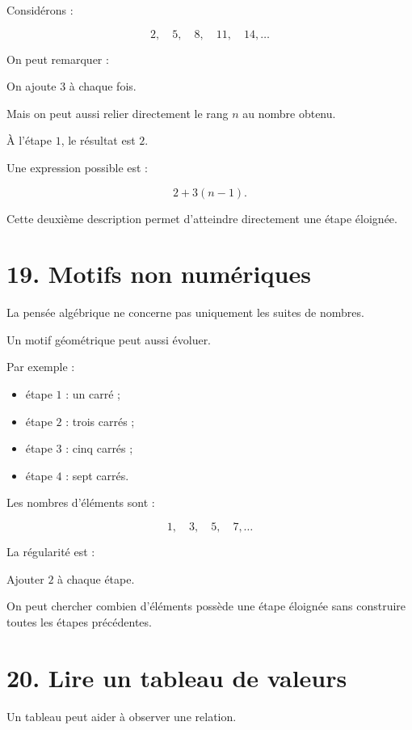 Considérons :

\[
2,\quad5,\quad8,\quad11,\quad14,\ldots
\]

On peut remarquer :

\begin{remarque}
On ajoute $3$ à chaque fois.
\end{remarque}

Mais on peut aussi relier directement le rang $n$ au nombre obtenu.

À l’étape $1$, le résultat est $2$.

Une expression possible est :

\[
2+3(n-1).
\]

Cette deuxième description permet d’atteindre directement une étape éloignée.

\section{19. Motifs non numériques}

La pensée algébrique ne concerne pas uniquement les suites de nombres.

Un motif géométrique peut aussi évoluer.

Par exemple :

\begin{itemize}
\item étape $1$ : un carré ;
\item étape $2$ : trois carrés ;
\item étape $3$ : cinq carrés ;
\item étape $4$ : sept carrés.
\end{itemize}

Les nombres d’éléments sont :

\[
1,\quad3,\quad5,\quad7,\ldots
\]

La régularité est :

\begin{remarque}
Ajouter $2$ à chaque étape.
\end{remarque}

On peut chercher combien d’éléments possède une étape éloignée sans construire toutes les étapes précédentes.

\section{20. Lire un tableau de valeurs}

Un tableau peut aider à observer une relation.

